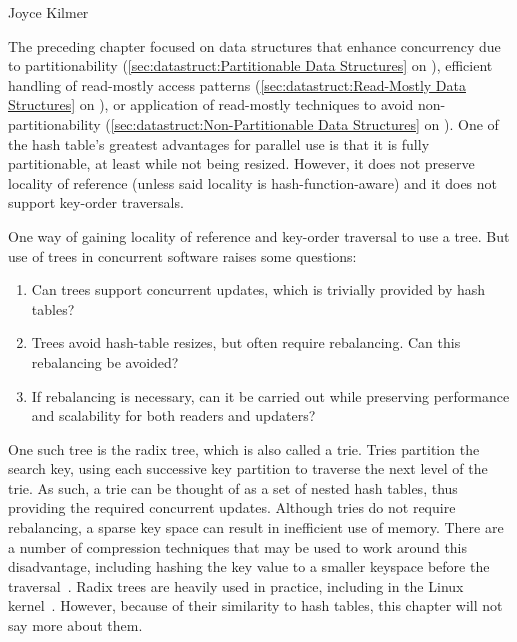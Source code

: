 
%
	 {Joyce Kilmer}

The preceding chapter focused on data structures that enhance
concurrency due to partitionability
(\cref{sec:datastruct:Partitionable Data Structures}
on
),
efficient handling of read-mostly access patterns
(\cref{sec:datastruct:Read-Mostly Data Structures}
on
),
or application of read-mostly techniques to avoid
non-partitionability
(\cref{sec:datastruct:Non-Partitionable Data Structures}
on
).
One of the hash table's greatest advantages for parallel use is that it
is fully partitionable, at least while not being resized.
However, it does not preserve locality of reference (unless said
locality is hash-function-aware) and it does not support key-order
traversals.

One way of gaining locality of reference and key-order traversal
to use a tree.
But use of trees in concurrent software raises some questions:

\begin{enumerate}
\item	Can trees support concurrent updates, which is trivially
	provided by hash tables?
\item	Trees avoid hash-table resizes, but often require
	rebalancing.
	Can this rebalancing be avoided?
\item	If rebalancing is necessary, can it be carried out while
	preserving performance and scalability for both readers
	and updaters?
\end{enumerate}

One such tree is the radix tree, which is also called a trie.
Tries partition the search key, using each successive key partition
to traverse the next level of the trie.
As such, a trie can be thought of as a set of nested hash tables,
thus providing the required concurrent updates.
Although tries do not require rebalancing, a sparse key space can result
in inefficient use of memory.
There are a number of compression techniques that may be used to
work around this disadvantage, including hashing the key value to
a smaller keyspace before the
traversal~\cite{RobertOlsson2007Trash}.
Radix trees are heavily used in practice, including in the Linux
kernel~\cite{NickPiggin2006radixtree}.
However, because of their similarity to hash tables, this chapter
will not say more about them.

